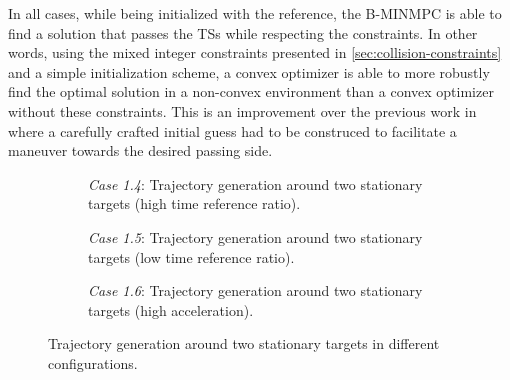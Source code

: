 In all cases, while being initialized with the reference, the B-MINMPC is able to find a solution that passes the TSs while respecting the constraints. In other words, using the mixed integer constraints presented in \cref{sec:collision-constraints} and a simple initialization scheme, a convex optimizer is able to more robustly find the optimal solution in a non-convex environment than a convex optimizer without these constraints. This is an improvement over the previous work in \citep{Thyri2022-MPC} where a carefully crafted initial guess had to be construced to facilitate a maneuver towards the desired passing side.
\begin{figure}
    \centering
    \begin{subfigure}[b]{\textwidth}
        \centering
        
        \caption{\emph{Case 1.4}: Trajectory generation around two stationary targets (high time reference ratio).}
        \label{fig:stationary-target-5}
    \end{subfigure}
    \hfill
    \begin{subfigure}[b]{\textwidth}
        \centering
        
        \caption{\emph{Case 1.5}: Trajectory generation around two stationary targets (low time reference ratio).}
        \label{fig:stationary-target-6}
    \end{subfigure}
    \hfill
    \begin{subfigure}[b]{\textwidth}
        \centering
        
        \caption{\emph{Case 1.6}: Trajectory generation around two stationary targets (high acceleration).}
        \label{fig:stationary-target-7}
    \end{subfigure}
    \caption{Trajectory generation around two stationary targets in different configurations.}
    \label{fig:stationary-targets-subfigures-2}
\end{figure}


